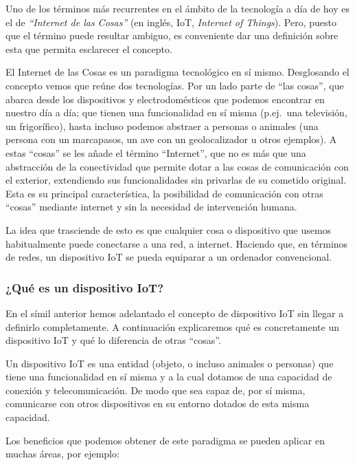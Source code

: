 \documentclass[a4paper,10pt]{article}
\begin{document}
Uno de los términos más recurrentes en el ámbito de la tecnología a día
de hoy es el de \textit{``Internet de las Cosas''} (en inglés, IoT, \textit{Internet of
Things}). Pero, puesto que el término puede resultar ambiguo, es
conveniente dar una definición sobre esta que permita esclarecer el
concepto.

El Internet de las Cosas es un paradigma tecnológico en sí mismo.
Desglosando el concepto vemos que reúne dos tecnologías. Por un lado
parte de ``las cosas'', que abarca desde los dispositivos y
electrodomésticos que podemos encontrar en nuestro día a día; que tienen
una funcionalidad en sí misma (p.ej.\ una televisión, un frigorífico),
hasta incluso podemos abstraer a personas o animales (una persona con un
marcapasos, un ave con un geolocalizador u otros
ejemplos\cite{iotagendawebsiteWhatInternetThings}). A estas ``cosas''
se les añade el término
``Internet'', que no es más que una abstracción de la conectividad que
permite dotar a las cosas de comunicación con el exterior, extendiendo
sus funcionalidades sin privarlas de su cometido original. Esta es
su principal característica, la posibilidad de comunicación con otras
``cosas'' mediante internet y sin la necesidad de intervención humana.

La idea que trasciende de esto es que cualquier cosa o dispositivo que
usemos habitualmente puede conectarse a una red, a internet. Haciendo
que, en términos de redes, un dispositivo IoT se pueda equiparar a un
ordenador convencional.

\subsubsection{¿Qué es un dispositivo
IoT?}\label{quuxe9-es-un-dispositivo-iot}

En el símil anterior hemos adelantado el concepto de dispositivo IoT sin
llegar a definirlo completamente. A continuación explicaremos qué es
concretamente un dispositivo IoT y qué lo diferencia de otras ``cosas''.

Un dispositivo IoT es una entidad (objeto, o incluso animales o
personas) que tiene una funcionalidad en sí misma y a la cual dotamos de
una capacidad de conexión y telecomunicación. De modo que sea capaz de,
por sí misma, comunicarse con otros dispositivos en su entorno dotados
de esta misma capacidad.

Los beneficios que podemos obtener de este paradigma se pueden aplicar
en muchas áreas\cite{vongsingthongs.;smanchats.IoTExamplesSuranaree},
por ejemplo:
\end{document}
